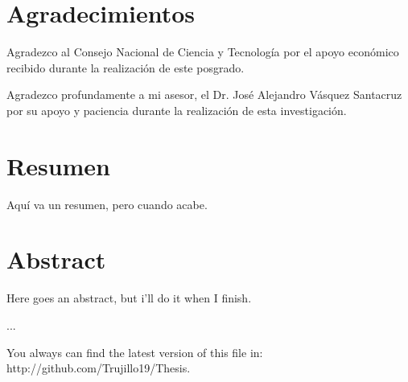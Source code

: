 \tableofcontents
\listoffigures
\listoftables

\chapter*{Agradecimientos} 

Agradezco al Consejo Nacional de Ciencia y Tecnología por el apoyo económico recibido durante la realización de este posgrado.

Agradezco profundamente a mi asesor, el Dr. José Alejandro Vásquez Santacruz por su apoyo y paciencia durante la realización de esta investigación.

\chapter*{Resumen}

Aquí va un resumen, pero cuando acabe.

\chapter*{Abstract}

Here goes an abstract, but i'll do it when I finish.

...

You always can find the latest version of this file in: http://github.com/Trujillo19/Thesis.

